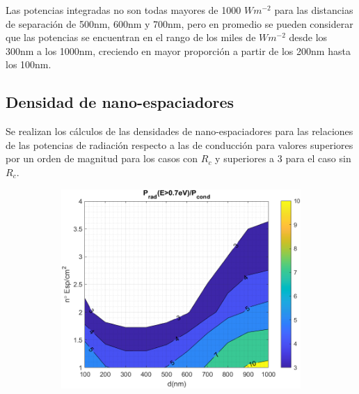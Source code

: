 Las potencias integradas no son todas mayores de 1000 $Wm^{-2}$ para las distancias de separación de 500nm, 600nm y 700nm, pero en promedio se pueden considerar que las potencias se encuentran en el rango de los miles de $Wm^{-2}$ desde los 300nm a los 1000nm, creciendo en mayor proporción a partir de los 200nm hasta los 100nm.
\subsection{Densidad de nano-espaciadores}
Se realizan los cálculos de las densidades de nano-espaciadores para las relaciones de las potencias de radiación respecto a las de conducción para valores superiores por un orden de magnitud para los casos con $R_c$ y superiores a 3 para el caso sin $R_c$.
\begin{figure}[H]
	\centering
	\begin{subfigure}[b]{0.49\textwidth}
		\centering
			\includegraphics[width=1.00\textwidth]{figuras/Resultados/RelacionCondRad/SS.png}
		\caption{ }
		\label{fig:rel_SsSiO2Ge}
	\end{subfigure}
	\hfill
	\begin{subfigure}[b]{0.49\textwidth}
		\centering

\end{subfigure}
\end{figure}
